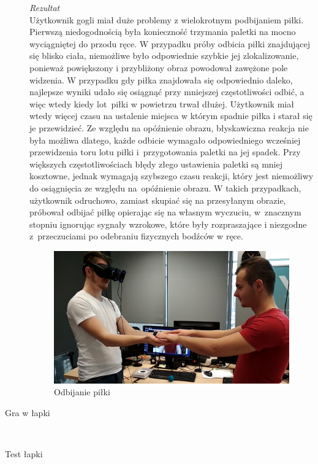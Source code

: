 \documentclass[a4paper,11pt,twoside]{report}
\theoremstyle{definition}
\begin{document}
\begin{description}
\textit{Rezultat}\\
Użytkownik gogli miał duże problemy z wielokrotnym podbijaniem piłki. Pierwszą niedogodnością była konieczność trzymania paletki na mocno wyciągniętej do przodu ręce. W przypadku próby odbicia piłki znajdującej się blisko ciała,  niemożliwe było odpowiednie szybkie jej zlokalizowanie, ponieważ powiększony i przybliżony obraz powodował zawężone pole widzenia. W przypadku gdy piłka znajdowała się odpowiednio daleko, najlepsze wyniki udało się osiągnąć przy mniejszej częstotliwości odbić, a więc wtedy kiedy lot~piłki w powietrzu trwał dłużej. Użytkownik miał wtedy więcej czasu na ustalenie miejsca w którym spadnie piłka i starał się je przewidzieć. Ze względu na opóźnienie obrazu, błyskawiczna reakcja nie była możliwa dlatego, każde odbicie wymagało odpowiedniego wcześniej przewidzenia toru lotu piłki i~przygotowania paletki na jej spadek. Przy większych częstotliwościach błędy złego ustawienia paletki są mniej kosztowne, jednak wymagają szybszego czasu reakcji, który jest niemożliwy do osiągnięcia ze względu na~opóźnienie obrazu. W takich przypadkach, użytkownik odruchowo, zamiast skupiać się na przesyłanym obrazie, próbował odbijać piłkę opierając się na własnym wyczuciu, w~znacznym stopniu ignorując sygnały wzrokowe, które były rozpraszające i niezgodne z~przeczuciami po odebraniu fizycznych bodźców w ręce. 

\begin{figure}[H]
\centering
\includegraphics[scale=0.25]{images/lapkiTest}
\caption[BounceTest]{Odbijanie piłki}
\end{figure}

\item[Gra w łapki] \hfill \\

\item [Test łapki] \hfill \\


\end{description}
\end{document}
